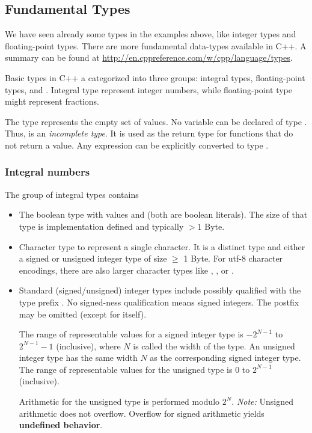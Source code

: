 \subsection{Fundamental Types\label{sec:fundamental-type}}
We have seen already some types in the examples above, like integer types and floating-point types. There are more fundamental data-types
available in C++. A summary can be found at \url{http://en.cppreference.com/w/cpp/language/types}.

Basic types in C++ a categorized into three groups: integral types, floating-point types, and . Integral type represent integer numbers, while floating-point type might represent fractions.

The type  represents the empty set of values. No variable can be declared of type . Thus,  is an \emph{incomplete type}. It is used as the return type for functions that do not return a value. Any expression can be explicitly converted to type .

\subsubsection{Integral numbers}
The group of integral types contains
\begin{itemize}
  \item The boolean type  with values  and  (both are boolean literals). The size of that type is implementation
  defined and typically $> 1$ Byte.
  \item Character type  to represent a single character. It is a distinct type and either a signed or unsigned integer type of size $\geq$ 1 Byte. For utf-8 character encodings, there are also larger character types like , , or .
  \item Standard (signed/unsigned) integer types include  possibly qualified with the type prefix
  . No signed-ness qualification means signed integers. The postfix  may be omitted (except for  itself).

  The range of representable values for a signed integer type is $-2^{N-1}$ to $2^{N-1} - 1$ (inclusive), where $N$ is called the width of the type.
  An unsigned integer type has the same width $N$ as the corresponding signed integer type. The range of representable values for the unsigned type
  is $0$ to $2^{N-1}$ (inclusive).

  Arithmetic for the unsigned type is performed modulo $2^N$. \emph{Note:} Unsigned arithmetic does not overflow. Overflow for signed arithmetic
  yields \textbf{undefined behavior}.
\end{itemize}


